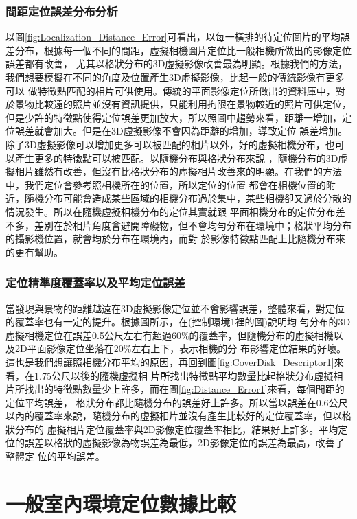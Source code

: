 \subsubsection{間距定位誤差分布分析}	
	
	以圖\ref{fig:Localization_Distance_Error}可看出，以每一橫排的待定位圖片的平均誤差分布，根據每一個不同的間距，虛擬相機圖片定位比一般相機所做出的影像定位誤差都有改善，
尤其以格狀分布的3D虛擬影像改善最為明顯。根據我們的方法，我們想要模擬在不同的角度及位置產生3D虛擬影像，比起一般的傳統影像有更多可以
做特徵點匹配的相片可供使用。傳統的平面影像定位所做出的資料庫中，對於景物比較遠的照片並沒有資訊提供，只能利用拘限在景物較近的照片可供定位，
但是少許的特徵點使得定位誤差更加放大，所以照圖中趨勢來看，距離一增加，定位誤差就會加大。但是在3D虛擬影像不會因為距離的增加，導致定位
誤差增加。除了3D虛擬影像可以增加更多可以被匹配的相片以外，好的虛擬相機分布，也可以產生更多的特徵點可以被匹配。以隨機分布與格狀分布來說
，隨機分布的3D虛擬相片雖然有改善，但沒有比格狀分布的虛擬相片改善來的明顯。在我們的方法中，我們定位會參考照相機所在的位置，所以定位的位置
都會在相機位置的附近，隨機分布可能會造成某些區域的相機分布過於集中，某些相機卻又過於分散的情況發生。所以在隨機虛擬相機分布的定位其實就跟
平面相機分布的定位分布差不多，差別在於相片角度會避開障礙物，但不會均勻分布在環境中；格狀平均分布的攝影機位置，就會均於分布在環境內，而對
於影像特徵點匹配上比隨機分布來的更有幫助。


\subsubsection{定位精準度覆蓋率以及平均定位誤差}	

	當發現與景物的距離越遠在3D虛擬影像定位並不會影響誤差，整體來看，對定位的覆蓋率也有一定的提升。根據圖所示，在(控制環境1裡的圖)說明均
勻分布的3D虛擬相機定位在誤差0.5公尺左右有超過$60\%$的覆蓋率，但隨機分布的虛擬相機以及2D平面影像定位坐落在$20\%$左右上下，表示相機的分
布影響定位結果的好壞。這也是我們想讓照相機分布平均的原因，再回到圖\ref{fig:CoverDisk_Descriptor1}來看，在1.75公尺以後的隨機虛擬相
片所找出特徵點平均數量比起格狀分布虛擬相片所找出的特徵點數量少上許多，而在圖\ref{fig:Distance_Error1}來看，每個間距的定位平均誤差，
格狀分布都比隨機分布的誤差好上許多。所以當以誤差在0.6公尺以內的覆蓋率來說，隨機分布的虛擬相片並沒有產生比較好的定位覆蓋率，但以格狀分布的
虛擬相片定位覆蓋率與2D影像定位覆蓋率相比，結果好上許多。平均定位的誤差以格狀的虛擬影像為物誤差為最低，2D影像定位的誤差為最高，改善了整體定
位的平均誤差。


\section{一般室內環境定位數據比較}


